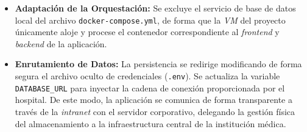 \begin{itemize}
    \item \textbf{Adaptación de la Orquestación:} Se excluye el servicio de base de datos local del archivo \texttt{docker-compose.yml}, de forma que la \textit{VM} del proyecto únicamente aloje y procese el contenedor correspondiente al \textit{frontend} y \textit{backend} de la aplicación.
    \item \textbf{Enrutamiento de Datos:} La persistencia se redirige modificando de forma segura el archivo oculto de credenciales (\texttt{.env}). Se actualiza la variable \texttt{DATABASE\_URL} para inyectar la cadena de conexión proporcionada por el hospital. De este modo, la aplicación se comunica de forma transparente a través de la \textit{intranet} con el servidor corporativo, delegando la gestión física del almacenamiento a la infraestructura central de la institución médica.
\end{itemize}